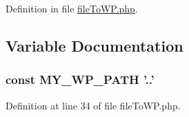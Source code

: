 Definition in file \hyperlink{file_to_w_p_8php_source}{file\+To\+W\+P.\+php}.



\subsection{Variable Documentation}
\hypertarget{file_to_w_p_8php_ab9655ee8f40d51ad76f2479000e8d41c}{
\subsubsection[{M\+Y\+\_\+\+W\+P\+\_\+\+P\+A\+T\+H}]{\setlength{\rightskip}{0pt plus 5cm}const M\+Y\+\_\+\+W\+P\+\_\+\+P\+A\+T\+H '..'}}\label{file_to_w_p_8php_ab9655ee8f40d51ad76f2479000e8d41c}


Definition at line 34 of file file\+To\+W\+P.\+php.

